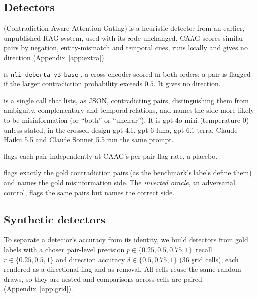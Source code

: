 \subsection{Detectors}
\label{sec:detectors}
\begin{description}[leftmargin=0pt,itemsep=1pt,topsep=2pt]
\item[CAAG] (Contradiction-Aware Attention Gating) is a heuristic detector from an earlier, unpublished RAG system,
used with its code unchanged. CAAG scores similar pairs by negation, entity-mismatch and temporal cues, runs locally
and gives no direction (Appendix~\ref{app:extra}).
\item[NLI] is \texttt{nli-deberta-v3-base} \citep{he2023debertav3}, a cross-encoder scored in both orders; a pair is
flagged if the larger contradiction probability exceeds $0.5$. It gives no direction.
\item[LLM] is a single call that lists, as JSON, contradicting pairs, distinguishing them from ambiguity, complementary and
temporal relations, and names the side more likely to be misinformation (or ``both'' or ``unclear''). It is
gpt-4o-mini (temperature 0) unless stated; in the crossed design gpt-4.1, gpt-6-luna, gpt-6.1-terra, Claude Haiku 5.5
and Claude Sonnet 5.5 run the same prompt.
\item[Random] flags each pair independently at CAAG's per-pair flag rate, a placebo.
\item[Oracle] flags exactly the gold contradiction pairs (as the benchmark's labels define them) and names the gold
misinformation side. The
\emph{inverted oracle}, an adversarial control, flags the same pairs but names the correct side.
\end{description}

\subsection{Synthetic detectors}
\label{sec:synthetic}
To separate a detector's accuracy from its identity, we build detectors from gold labels with a chosen pair-level
precision $p\in\{0.25,0.5,0.75,1\}$, recall $r\in\{0.25,0.5,1\}$ and direction accuracy $d\in\{0.5,0.75,1\}$ (36
grid cells), each rendered as a directional flag and as removal. All cells reuse the same random draws, so they are nested
and comparisons across cells are paired (Appendix~\ref{app:grid}).
